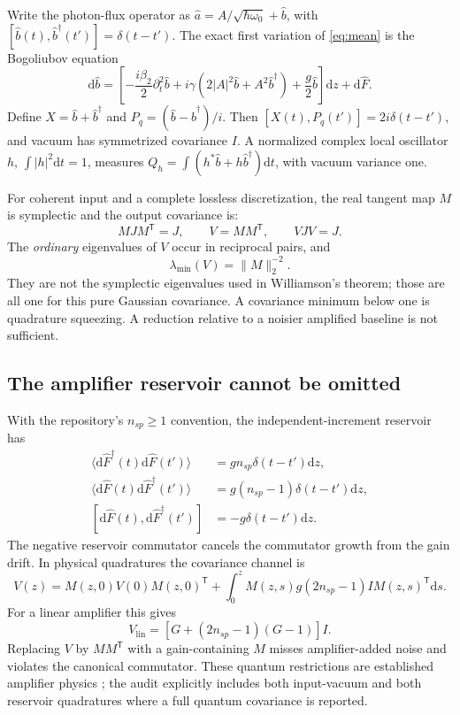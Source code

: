 \documentclass[11pt,a4paper]{article}
\newcommand{\dd}{\mathrm d}
\begin{document}
Write the photon-flux operator as $\hat a=A/\sqrt{\hbar\omega_0}+\hat b$, with $[\hat b(t),\hat b^\dagger(t')]=\delta(t-t')$. The exact first variation of \eqref{eq:mean} is the Bogoliubov equation
\begin{equation}\label{eq:bdg}
\dd\hat b=\left[-\frac{i\beta_2}{2}\partial_t^2\hat b
+i\gamma(2|A|^2\hat b+A^2\hat b^\dagger)+\frac g2\hat b\right]\dd z+\dd\hat F.
\end{equation}
Define $X=\hat b+\hat b^\dagger$ and $P_q=(\hat b-\hat b^\dagger)/i$. Then $[X(t),P_q(t')]=2i\delta(t-t')$, and vacuum has symmetrized covariance $I$. A normalized complex local oscillator $h$, $\int|h|^2\dd t=1$, measures $Q_h=\int(h^*\hat b+h\hat b^\dagger)\dd t$, with vacuum variance one.

For coherent input and a complete lossless discretization, the real tangent map $M$ is symplectic and the output covariance is:
\begin{equation}\label{eq:sympl}
MJM^{\mathsf T}=J,\qquad V=MM^{\mathsf T},\qquad VJV=J.
\end{equation}
The \emph{ordinary} eigenvalues of $V$ occur in reciprocal pairs, and
\begin{equation}\label{eq:recip}
\lambda_{\min}(V)=\|M\|_2^{-2}.
\end{equation}
They are not the symplectic eigenvalues used in Williamson's theorem; those are all one for this pure Gaussian covariance. A covariance minimum below one is quadrature squeezing. A reduction relative to a noisier amplified baseline is not sufficient.

\subsection{The amplifier reservoir cannot be omitted}

With the repository's $n_{sp}\ge1$ convention, the independent-increment reservoir has
\begin{align}
\langle\dd\hat F^\dagger(t)\dd\hat F(t')\rangle&=gn_{sp}\delta(t-t')\dd z,\\
\langle\dd\hat F(t)\dd\hat F^\dagger(t')\rangle&=g(n_{sp}-1)\delta(t-t')\dd z,\\
[\dd\hat F(t),\dd\hat F^\dagger(t')]&=-g\delta(t-t')\dd z.
\end{align}
The negative reservoir commutator cancels the commutator growth from the gain drift. In physical quadratures the covariance channel is
\begin{equation}\label{eq:ase}
V(z)=M(z,0)V(0)M(z,0)^{\mathsf T}
+\int_0^z M(z,s)g(2n_{sp}-1)I M(z,s)^{\mathsf T}\dd s.
\end{equation}
For a linear amplifier this gives
\begin{equation}\label{eq:linearamp}
V_{\mathrm{lin}}=[G+(2n_{sp}-1)(G-1)]I.
\end{equation}
Replacing $V$ by $MM^{\mathsf T}$ with a gain-containing $M$ misses amplifier-added noise and violates the canonical commutator. These quantum restrictions are established amplifier physics \cite{caves,drummondcorney}; the audit explicitly includes both input-vacuum and both reservoir quadratures where a full quantum covariance is reported.
\end{document}

